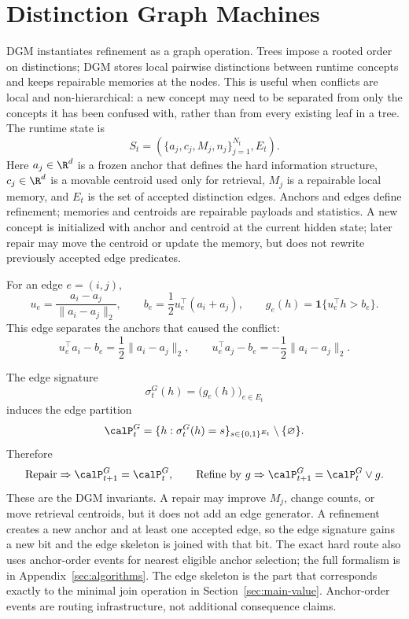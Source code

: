 \section{Distinction Graph Machines}
\label{sec:main-dgm}

DGM instantiates refinement as a graph operation.
Trees impose a rooted order on distinctions; DGM stores local pairwise distinctions between runtime concepts and keeps repairable memories at the nodes.
This is useful when conflicts are local and non-hierarchical: a new concept may need to be separated from only the concepts it has been confused with, rather than from every existing leaf in a tree.
The runtime state is
\[
S_t=
\left(
\{a_j,c_j,M_j,n_j\}_{j=1}^{N_t},
E_t
\right).
\]
Here $a_j\in\R^d$ is a frozen anchor that defines the hard information structure, $c_j\in\R^d$ is a movable centroid used only for retrieval, $M_j$ is a repairable local memory, and $E_t$ is the set of accepted distinction edges.
Anchors and edges define refinement; memories and centroids are repairable payloads and statistics.
A new concept is initialized with anchor and centroid at the current hidden state; later repair may move the centroid or update the memory, but does not rewrite previously accepted edge predicates.

For an edge $e=(i,j)$,
\[
u_e=\frac{a_i-a_j}{\|a_i-a_j\|_2},
\qquad
b_e=\frac12u_e^\top(a_i+a_j),
\qquad
g_e(h)=\mathbf 1\{u_e^\top h>b_e\}.
\]
This edge separates the anchors that caused the conflict:
\[
u_e^\top a_i-b_e=\frac12\|a_i-a_j\|_2,
\qquad
u_e^\top a_j-b_e=-\frac12\|a_i-a_j\|_2.
\]

The edge signature
\[
\sigma^G_t(h)=\bigl(g_e(h)\bigr)_{e\in E_t}
\]
induces the edge partition
\[
\calP^G_t
=
\{h:\sigma^G_t(h)=s\}_{s\in\{0,1\}^{E_t}}
\setminus\{\varnothing\}.
\]
Therefore
\[
\mathrm{Repair}\Rightarrow \calP^G_{t+1}=\calP^G_t,
\qquad
\mathrm{Refine\ by\ }g\Rightarrow \calP^G_{t+1}=\calP^G_t\vee g.
\]
These are the DGM invariants.
A repair may improve $M_j$, change counts, or move retrieval centroids, but it does not add an edge generator.
A refinement creates a new anchor and at least one accepted edge, so the edge signature gains a new bit and the edge skeleton is joined with that bit.
The exact hard route also uses anchor-order events for nearest eligible anchor selection; the full formalism is in Appendix~\ref{sec:algorithms}.
The edge skeleton is the part that corresponds exactly to the minimal join operation in Section~\ref{sec:main-value}.
Anchor-order events are routing infrastructure, not additional consequence claims.

